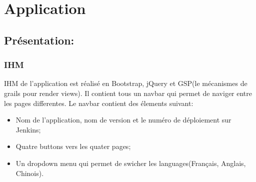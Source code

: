 \section{Application}
\subsection{Présentation:}

\subsubsection{IHM}
IHM de l'application est réalisé en Bootstrap, jQuery et GSP(le mécanismes de grails pour render views).
Il contient tous un navbar qui permet de naviger entre les pages differentes.
Le navbar contient des élements suivant:
\begin{itemize}
 \item Nom de l'application, nom de version et le numéro de déploiement sur Jenkins;
 \item Quatre buttons vers les quater pages;
 \item Un dropdown menu qui permet de swicher les languages(Français, Anglais, Chinois).
\end{itemize}

